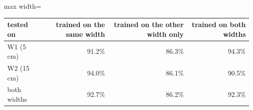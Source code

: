 \begin{adjustbox}{max width=\textwidth}
{\footnotesize
\begin{tabular}{lrrr}
\toprule
\textbf{tested on} & \textbf{trained on the same width} & \textbf{trained on the other width only} & \textbf{trained on both widths} \\
\midrule
W1 (5 cm) & 91.2\% & 86.3\% & 94.3\% \\
W2 (15 cm) & 94.0\% & 86.1\% & 90.5\% \\
both widths & 92.7\% & 86.2\% & 92.3\% \\
\bottomrule
\end{tabular}
}
\end{adjustbox}
